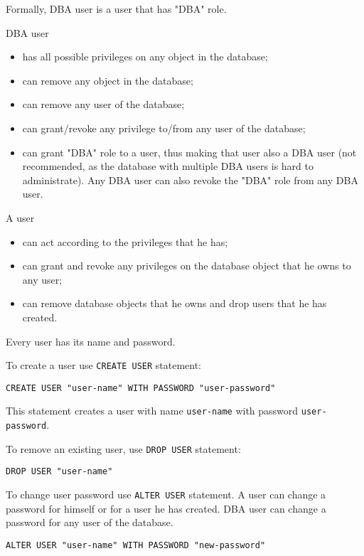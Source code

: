 \documentclass[a4paper,12pt]{article}
\begin{document}
Formally, DBA user is a user that has "DBA" role.

DBA user
\begin{itemize}
\item has all possible privileges on any object in the database;
\item can remove any object in the database;
\item can remove any user of the database;
\item can grant/revoke any privilege to/from any user of the database;
\item can grant "DBA" role to a user, thus making that user also a DBA user (not recommended, as the database with multiple DBA users is hard to administrate). Any DBA user can also revoke the "DBA" role from any DBA user.
\end{itemize}

A user
\begin{itemize}
\item can act according to the privileges that he has;
\item can grant and revoke any privileges on the database object that he owns to any user;
\item can remove database objects that he owns and drop users that he has created. 
\end{itemize}

Every user has its name and password.

To create a user use \verb!CREATE USER! statement:

\begin{verbatim}
CREATE USER "user-name" WITH PASSWORD "user-password"
\end{verbatim}

This statement creates a user with name \verb!user-name! with password \verb!user-password!.

To remove an existing user, use \verb!DROP USER! statement:

\begin{verbatim}
DROP USER "user-name"
\end{verbatim}

To change user password use \verb!ALTER USER! statement. A user can change a password for himself or for a user he has created. DBA user can change a password for any user of the database.

\begin{verbatim}
ALTER USER "user-name" WITH PASSWORD "new-password"
\end{verbatim}
\end{document}
